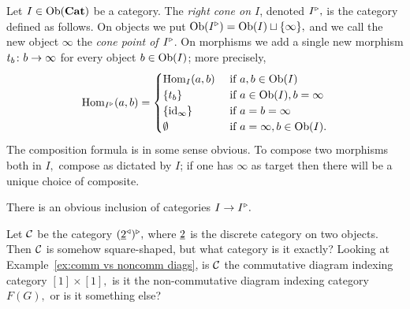 \documentclass[CT4S-EN-RU]{subfiles}
\begin{document}
\begin{definitionENG}\label{def:rcone}
Let $I\in\textnormal{Ob}({\mathbf{Cat}})$ be a category. The {\em right cone on $I$}, denoted $I^\triangleright,$ is the category defined as follows. On objects we put $\textnormal{Ob}(I^\triangleright)=\textnormal{Ob}(I)\sqcup\{\infty\},$ and we call the new object $\infty$ the {\em cone point of $I^\triangleright$}. On morphisms we add a single new morphism $t_b\colon b\rightarrow\infty$ for every object $b\in \textnormal{Ob}(I)$; more precisely,
$$\textnormal{Hom}_{I^\triangleright}(a,b)=
\begin{cases}
\textnormal{Hom}_I(a,b)&\textnormal{ if }a,b\in\textnormal{Ob}(I)\\
\{t_b\}&\textnormal{ if }a\in\textnormal{Ob}(I), b=\infty\\
\{\textnormal{id}_{\infty}\}&\textnormal{ if } a=b=\infty\\
\emptyset&\textnormal{ if } a=\infty,b\in\textnormal{Ob}(I).
\end{cases}$$
The composition formula is in some sense obvious. To compose two morphisms both in $I,$ compose as dictated by $I$; if one has $\infty$ as target then there will be a unique choice of composite.

There is an obvious inclusion of categories $I\rightarrow I^\triangleright.$
\end{definitionENG}

\begin{definitionRUS}\label{def:rcone}
\end{definitionRUS}

\begin{exerciseENG}
Let $\mathcal{C}$ be the category $(\underline{2}^\triangleleft)^\triangleright,$ where $\underline{2}$ is the discrete category on two objects. Then $\mathcal{C}$ is somehow square-shaped, but what category is it exactly? Looking at Example~\ref{ex:comm vs noncomm diags}, is $\mathcal{C}$ the commutative diagram indexing category $[1]\times[1],$ is it the non-commutative diagram indexing category $F(G),$ or is it something else?
\end{exerciseENG}

\begin{exerciseRUS}
\end{exerciseRUS}


\subsection{}\label{sec:lims and colims in a cat}
\end{document}
